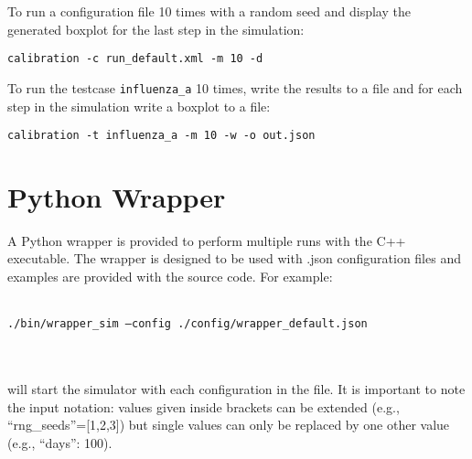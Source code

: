 To run a configuration file 10 times with a random seed and display the generated boxplot for the last step in the simulation:\\

\centerline{\texttt{calibration -c run\_default.xml -m 10 -d}}

To run the testcase \texttt{influenza\_a} 10 times, write the results to a file and for each step in the simulation write a boxplot to a file:\\

\centerline{\texttt{calibration -t influenza\_a -m 10 -w -o out.json}}



\section{Python Wrapper}
A Python wrapper is provided to perform multiple runs with the C++ executable. 
The wrapper is designed to be used with .json configuration files and examples are provided with the source code. 
For example: \\ \\
\centerline{\texttt{./bin/wrapper\_sim --config ./config/wrapper\_default.json}} \\ \\
will start the simulator with each configuration in the file.
It is important to note the input notation: values given inside brackets can be extended (e.g., ``rng\_seeds''=[1,2,3]) but single values can only be replaced by one other value (e.g., ``days'': 100).


